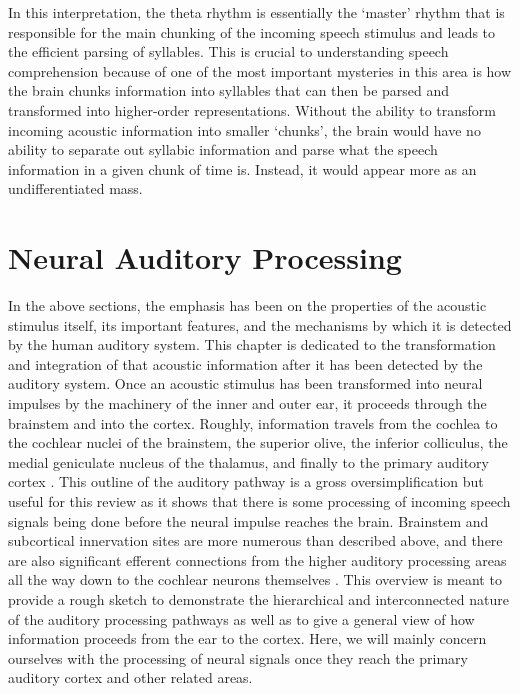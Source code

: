 \documentclass[titlepage]{article}
\begin{document}
    In this interpretation, the theta rhythm is essentially the `master' rhythm
    that is responsible for the main chunking of the incoming speech stimulus
    and leads to the efficient parsing of syllables. This is crucial to
    understanding speech comprehension because of one of the most important
    mysteries in this area is how the brain chunks information into syllables
    that can then be parsed and transformed into higher-order representations.
    Without the ability to transform incoming acoustic information into smaller
    `chunks', the brain would have no ability to separate out syllabic
    information and parse what the speech information in a given chunk of time
    is. Instead, it would appear more as an undifferentiated mass.

\section{Neural Auditory Processing} \label{corticalAuditoryProcessing}

  In the above sections, the emphasis has been on the properties of the
  acoustic stimulus itself, its important features, and the mechanisms by
  which it is detected by the human auditory system. This chapter is dedicated
  to the transformation and integration of that acoustic information after it
  has been detected by the auditory system. Once an acoustic stimulus has
  been transformed into neural impulses by the machinery of the inner and outer
  ear, it proceeds through the brainstem and into the cortex. Roughly,
  information travels from the cochlea to the cochlear nuclei of the brainstem,
  the superior olive, the inferior colliculus, the medial geniculate nucleus of
  the thalamus, and finally to the primary auditory cortex
  \cite{Hickok2007,Webster1992}. This outline of the auditory pathway is
  a gross oversimplification but useful for this review as it shows that 
  there is some processing of incoming speech signals being done before the
  neural impulse reaches the brain. Brainstem and subcortical innervation
  sites are more numerous than described above, and there are also significant
  efferent connections from the higher auditory processing areas all the way
  down to the cochlear neurons themselves \cite{Kandel2000,Webster1992}. This
  overview is meant to provide a rough sketch to demonstrate the hierarchical
  and interconnected nature of the auditory processing pathways as well as to
  give a general view of how information proceeds from the ear to the cortex.
  Here, we will mainly concern ourselves with the processing of neural signals
  once they reach the primary auditory cortex and other related areas.
\end{document}
